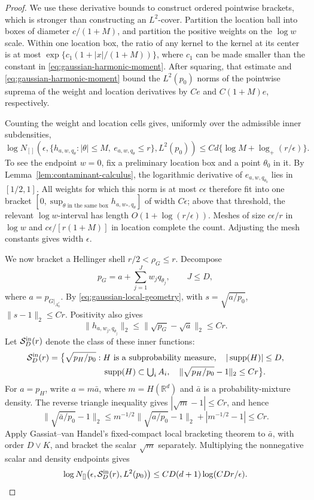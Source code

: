 \documentclass[11pt]{article}
\theoremstyle{definition}
\numberwithin{equation}{section}
\newcommand{\R}{\mathbb{R}}
\DeclareMathOperator{\supp}{supp}
\begin{document}
\begin{proof}
We use these derivative bounds to construct ordered pointwise brackets,
which is stronger than constructing an \(L^2\)-cover. Partition the location
ball into boxes of diameter \(c/(1+M)\), and partition the positive weights
on the \(\log w\) scale. Within one location box, the ratio of any kernel to
the kernel at its center is at most
\(\exp\{c_1(1+|x|/(1+M))\}\), where \(c_1\) can be made smaller than the
constant in \eqref{eq:gaussian-harmonic-moment}. After squaring, that estimate
and \eqref{eq:gaussian-harmonic-moment} bound the \(L^2(p_0)\) norms of the
pointwise suprema of the weight and location derivatives by
\(Ce\) and \(C(1+M)e\), respectively.

Counting the weight and location cells gives, uniformly over the admissible
inner subdensities,
\begin{equation}
\label{eq:gaussian-one-contaminant-bracket}
 \log N_{[]}\left(
 \epsilon,
 \{h_{a,w,q_\theta}:|\theta|\le M,\ e_{a,w,q_\theta}\le r\},
 L^2(p_0)\right)
 \le Cd\{\log M+\log_+(r/\epsilon)\}.
\end{equation}
To see the endpoint \(w=0\), fix a preliminary location box and a point
\(\theta_0\) in it. By Lemma~\ref{lem:contaminant-calculus}, the logarithmic
derivative of \(e_{a,w,q_{\theta_0}}\) lies in \([1/2,1]\). All weights for
which this norm is at most \(c\epsilon\) therefore fit into one bracket
\([0,\sup_{\theta\text{ in the same box}}h_{a,w_*,q_\theta}]\) of width
\(C\epsilon\); above that
threshold, the relevant \(\log w\)-interval has length
\(O(1+\log(r/\epsilon))\). Meshes of size \(c\epsilon/r\) in \(\log w\)
and \(c\epsilon/[r(1+M)]\) in location complete the count. Adjusting the
mesh constants gives width \(\epsilon\).

We now bracket a Hellinger shell \(r/2<\rho_G\le r\). Decompose
\[
 p_G=a+\sum_{j=1}^Jw_jq_{\theta_j},\qquad J\le D,
\]
where \(a=p_{G|_{A_0^c}}\). By \eqref{eq:gaussian-local-geometry}, with
\(s=\sqrt{a/p_0}\),
\(\|s-1\|_2\le Cr\). Positivity also gives
\[
 \|h_{a,w_j,q_{\theta_j}}\|_2
 \le\|\sqrt{p_G}-\sqrt a\|_2\le Cr.
\]
Let \(\mathcal S_D^{\rm in}(r)\) denote the class of these inner functions:
\[
 \begin{split}
 \mathcal S_D^{\rm in}(r)=\bigl\{\sqrt{p_H/p_0}:{}&
 H\text{ is a subprobability measure},\quad |\supp(H)|\le D,\\
 &\supp(H)\subset\textstyle\bigcup_iA_i,\quad
 \|\sqrt{p_H/p_0}-1\|_2\le Cr\bigr\}.
 \end{split}
\]
For \(a=p_H\), write \(a=m\bar a\), where \(m=H(\R^d)\) and
\(\bar a\) is a probability-mixture density. The reverse triangle
inequality gives \(|\sqrt m-1|\le Cr\), and hence
\[
 \|\sqrt{\bar a/p_0}-1\|_2
 \le m^{-1/2}\|\sqrt{a/p_0}-1\|_2+|m^{-1/2}-1|
 \le Cr.
\]
Apply Gassiat--van Handel's fixed-compact local bracketing theorem to
\(\bar a\), with order \(D\vee K\), and bracket the scalar \(\sqrt m\)
separately. Multiplying the nonnegative scalar and density endpoints gives
\[
 \log N_{[]}\bigl(\epsilon,
 \mathcal S_D^{\rm in}(r),L^2(p_0)\bigr)
 \le CD(d+1)\log(CDr/\epsilon).
\]


\end{proof}
\end{document}
